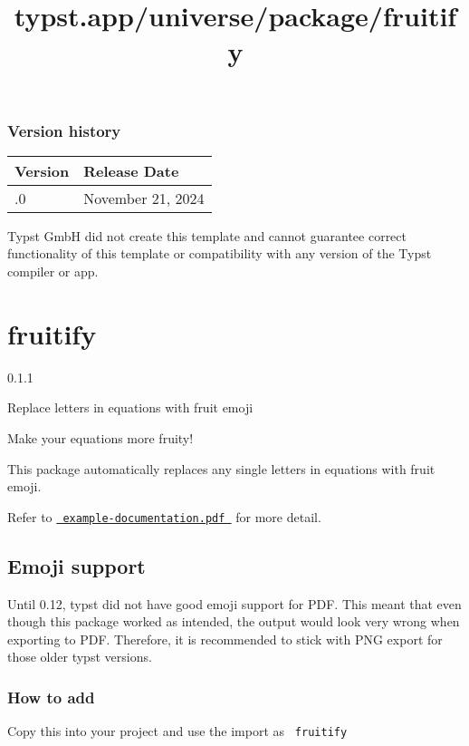 \subsubsection{Version history}\label{version-history}

\begin{longtable}[]{@{}ll@{}}
\toprule\noalign{}
Version & Release Date \\
\midrule\noalign{}
\endhead
\bottomrule\noalign{}
\endlastfoot
0.1.0 & November 21, 2024 \\
\end{longtable}

Typst GmbH did not create this template and cannot guarantee correct
functionality of this template or compatibility with any version of the
Typst compiler or app.


\title{typst.app/universe/package/fruitify}

\label{banner}
\section{fruitify}\label{fruitify}

{ 0.1.1 }

Replace letters in equations with fruit emoji

\label{readme}
Make your equations more fruity!

This package automatically replaces any single letters in equations with
fruit emoji.

Refer to
\href{https://codeberg.org/T0mstone/typst-fruitify/src/tag/0.1.1/example-documentation.pdf}{\texttt{\ example-documentation.pdf\ }}
for more detail.

\subsection{Emoji support}\label{emoji-support}

Until 0.12, typst did not have good emoji support for PDF. This meant
that even though this package worked as intended, the output would look
very wrong when exporting to PDF. Therefore, it is recommended to stick
with PNG export for those older typst versions.

\subsubsection{How to add}\label{how-to-add}

Copy this into your project and use the import as \texttt{\ fruitify\ }

